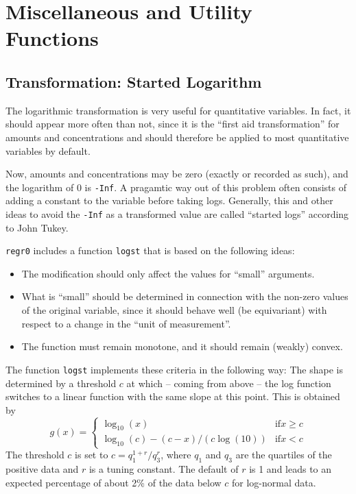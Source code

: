 \documentclass{article}
\providecommand{\Vneed}[1]{\penalty-5000\vskip#1%
\penalty-5000\vspace{-#1}}
\begin{document}
\Vneed{50mm}
\section{Miscellaneous and Utility Functions}
\subsection{Transformation: Started Logarithm}
The logarithmic transformation is very useful for quantitative variables. 
In fact, it should appear more often than not, since it is the
``first aid transformation'' for amounts and concentrations and should
therefore be applied to most quantitative variables by default.

Now, amounts and concentrations may be zero (exactly or recorded as such),
and the logarithm of 0 is \texttt{-Inf}. 
A pragamtic way out of this problem often consists of adding a constant
to the variable before taking logs. 
Generally, this and other ideas to avoid the \texttt{-Inf} as a transformed
value are called ``started logs'' according to John Tukey.

\texttt{regr0} includes a function \texttt{logst} that is based on the
following ideas:
\begin{itemize}
\item 
The modification should only affect the values for ``small'' arguments.
\item
What is ``small'' should be determined in connection with the non-zero 
values of the original variable, since it should behave well (be
equivariant) with respect to a change in the ``unit of measurement''.
\item
The function must remain monotone, and it should remain (weakly) convex.
\end{itemize}

The function \texttt{logst} implements these criteria in the following way: 
The shape is determined by a threshold $c$ at which -- coming from above --
the log function switches to a linear function with the same slope at this
point. This is obtained by
$$
  g(x) = \left\{\begin{array}{ll}\log_{10}(x) & \mbox{if} x\ge c\\
         \log_{10}(c) - (c-x)/(c\log(10)) & \mbox{if} x< c
         \end{array}\right.
$$
The threshold $c$ is set to
$ c = q_1^{1+r}/q_3^r$, where $q_1$ and $q_3$ are the quartiles of the 
positive data and $r$ is a tuning constant. 
The default of $r$ is 1 and leads to an expected
percentage of about 2\% of the data below $c$ for log-normal data.
\end{document}
